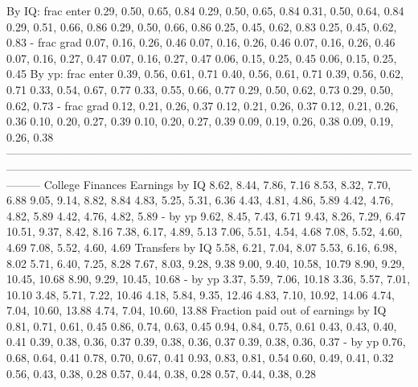                      By IQ: frac enter       0.29, 0.50, 0.65, 0.84       0.29, 0.50, 0.65, 0.84   0.31, 0.50, 0.64, 0.84    0.29, 0.51, 0.66, 0.86    0.29, 0.50, 0.66, 0.86    0.25, 0.45, 0.62, 0.83    0.25, 0.45, 0.62, 0.83
                           - frac grad       0.07, 0.16, 0.26, 0.46       0.07, 0.16, 0.26, 0.46   0.07, 0.16, 0.26, 0.46    0.07, 0.16, 0.27, 0.47    0.07, 0.16, 0.27, 0.47    0.06, 0.15, 0.25, 0.45    0.06, 0.15, 0.25, 0.45
                     By yp: frac enter       0.39, 0.56, 0.61, 0.71       0.40, 0.56, 0.61, 0.71   0.39, 0.56, 0.62, 0.71    0.33, 0.54, 0.67, 0.77    0.33, 0.55, 0.66, 0.77    0.29, 0.50, 0.62, 0.73    0.29, 0.50, 0.62, 0.73
                           - frac grad       0.12, 0.21, 0.26, 0.37       0.12, 0.21, 0.26, 0.37   0.12, 0.21, 0.26, 0.36    0.10, 0.20, 0.27, 0.39    0.10, 0.20, 0.27, 0.39    0.09, 0.19, 0.26, 0.38    0.09, 0.19, 0.26, 0.38
---------------------------------------------------------------------------------------------------------------------------------------------------------------------------------------------------------------------------------
                      College Finances                                                                                                                                                                                           
                        Earnings by IQ       8.62, 8.44, 7.86, 7.16       8.53, 8.32, 7.70, 6.88   9.05, 9.14, 8.82, 8.84    4.83, 5.25, 5.31, 6.36    4.43, 4.81, 4.86, 5.89    4.42, 4.76, 4.82, 5.89    4.42, 4.76, 4.82, 5.89
                               - by yp       9.62, 8.45, 7.43, 6.71       9.43, 8.26, 7.29, 6.47  10.51, 9.37, 8.42, 8.16    7.38, 6.17, 4.89, 5.13    7.06, 5.51, 4.54, 4.68    7.08, 5.52, 4.60, 4.69    7.08, 5.52, 4.60, 4.69
                       Transfers by IQ       5.58, 6.21, 7.04, 8.07       5.53, 6.16, 6.98, 8.02   5.71, 6.40, 7.25, 8.28    7.67, 8.03, 9.28, 9.38  9.00, 9.40, 10.58, 10.79  8.90, 9.29, 10.45, 10.68  8.90, 9.29, 10.45, 10.68
                               - by yp      3.37, 5.59, 7.06, 10.18      3.36, 5.57, 7.01, 10.10  3.48, 5.71, 7.22, 10.46   4.18, 5.84, 9.35, 12.46  4.83, 7.10, 10.92, 14.06  4.74, 7.04, 10.60, 13.88  4.74, 7.04, 10.60, 13.88
   Fraction paid out of earnings by IQ       0.81, 0.71, 0.61, 0.45       0.86, 0.74, 0.63, 0.45   0.94, 0.84, 0.75, 0.61    0.43, 0.43, 0.40, 0.41    0.39, 0.38, 0.36, 0.37    0.39, 0.38, 0.36, 0.37    0.39, 0.38, 0.36, 0.37
                               - by yp       0.76, 0.68, 0.64, 0.41       0.78, 0.70, 0.67, 0.41   0.93, 0.83, 0.81, 0.54    0.60, 0.49, 0.41, 0.32    0.56, 0.43, 0.38, 0.28    0.57, 0.44, 0.38, 0.28    0.57, 0.44, 0.38, 0.28
